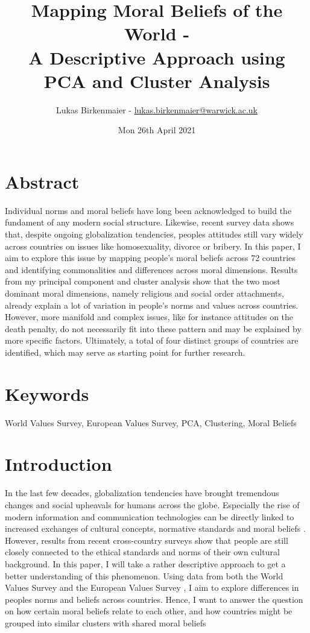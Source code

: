 \documentclass{article}[hidelinks]
\title{\bf Mapping Moral Beliefs of the World - \\
\bigskip
\bigskip
A Descriptive Approach using PCA and Cluster Analysis
}
\author{Lukas Birkenmaier - \url{lukas.birkenmaier@warwick.ac.uk}}
\date{Mon 26th April 2021}
\begin{document}
\maketitle
\section*{Abstract}
\begin{adjustwidth}{1cm}{1cm}
Individual norms and moral beliefs have long been acknowledged to build the fundament of any modern social structure. Likewise, recent survey data shows that, despite ongoing globalization tendencies, peoples attitudes still vary widely across countries on issues like homosexuality, divorce or bribery. In this paper, I aim to explore this issue by mapping people's moral beliefs across 72 countries and identifying commonalities and differences across moral dimensions. Results from my principal component and cluster analysis show that the two most dominant moral dimensions, namely religious and social order attachments, already explain a lot of variation in people's norms and values across countries. However, more manifold and complex issues, like for instance attitudes on the death penalty, do not necessarily fit into these pattern and may be explained by more specific factors. Ultimately, a total of four distinct groups of countries are identified, which may serve as starting point for further research.
\end{adjustwidth}

\section*{Keywords}
\hspace{1cm} World Values Survey, European Values Survey, PCA, Clustering, Moral Beliefs
\newpage \tableofcontents 
\newpage \listoffigures

\section{Introduction}

In the last few decades, globalization tendencies have brought tremendous changes and social upheavals for humans across the globe. Especially the rise of modern information and communication technologies can be directly linked to increased exchanges of cultural concepts, normative standards and moral beliefs \citep{Adamczyk.2013}. However, results from recent cross-country surveys show that people are still closely connected to the ethical standards and norms of their own cultural background. In this paper, I will take a rather descriptive approach to get a better understanding of this phenomenon. 
Using data from both the World Values Survey \citep{Haerpfer.2020} and the European Values Survey \citep{luijkx2021european}, I aim to explore differences in peoples norms and beliefs across countries. Hence, I want to answer the question on how certain moral beliefs relate to each other, and how countries might be grouped into similar clusters with shared moral beliefs
\end{document}
